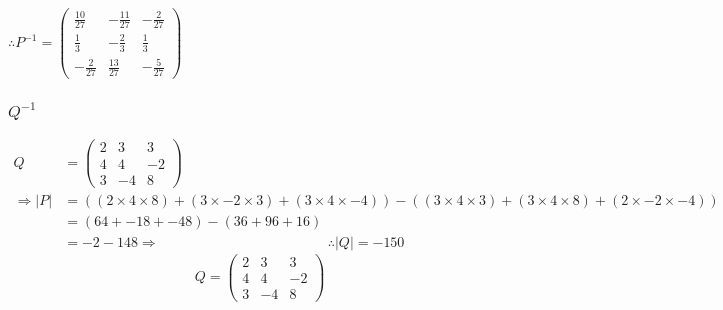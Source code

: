 \documentclass{article}
\begin{document}
\begin{center}\vspace{0.5cm}$\therefore
	P^{-1}=
	\begin{pmatrix}
		\frac{10}{27} & -\frac{11}{27} & -\frac{2}{27}\\
		\frac{1}{3} & -\frac{2}{3} & \frac{1}{3}\\
		-\frac{2}{27} & \frac{13}{27} & -\frac{5}{27}
	\end{pmatrix}
$\end{center}
\subsubsection{$Q^{-1}$}
\begin{align*}
	Q &=
	\begin{pmatrix}
		2 & 3 & 3\\
		4 & 4 & -2\\
		3 & -4 & 8
	\end{pmatrix}
	\\
	\Rightarrow
	|P| &= 
	((2\times4\times8)+(3\times-2\times3)+(3\times4\times-4)) - ((3\times4\times3)+(3\times4\times8)+(2\times-2\times-4))
	\\
	&=
	(64+-18+-48)-(36+96+16)
	\\
	&=
	-2-148
	\Rightarrow
	\qquad
	\qquad
	\qquad
	\qquad
	\qquad
	\qquad
	\therefore |Q| = -150
\end{align*}
\[
Q =
	\begin{pmatrix}
		2 & 3 & 3\\
		4 & 4 & -2\\
		3 & -4 & 8
	\end{pmatrix}
\]
\end{document}
